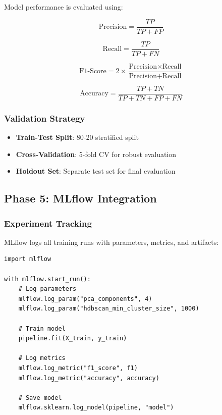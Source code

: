 Model performance is evaluated using:

\begin{equation}
    \text{Precision} = \frac{TP}{TP + FP}
\end{equation}

\begin{equation}
    \text{Recall} = \frac{TP}{TP + FN}
\end{equation}

\begin{equation}
    \text{F1-Score} = 2 \times \frac{\text{Precision} \times \text{Recall}}{\text{Precision} + \text{Recall}}
\end{equation}

\begin{equation}
    \text{Accuracy} = \frac{TP + TN}{TP + TN + FP + FN}
\end{equation}

\subsubsection{Validation Strategy}

\begin{itemize}
    \item \textbf{Train-Test Split}: 80-20 stratified split
    \item \textbf{Cross-Validation}: 5-fold CV for robust evaluation
    \item \textbf{Holdout Set}: Separate test set for final evaluation
\end{itemize}

\subsection{Phase 5: MLflow Integration}

\subsubsection{Experiment Tracking}

MLflow logs all training runs with parameters, metrics, and artifacts:

\begin{lstlisting}[style=python, caption=MLflow Tracking]
import mlflow

with mlflow.start_run():
    # Log parameters
    mlflow.log_param("pca_components", 4)
    mlflow.log_param("hdbscan_min_cluster_size", 1000)
    
    # Train model
    pipeline.fit(X_train, y_train)
    
    # Log metrics
    mlflow.log_metric("f1_score", f1)
    mlflow.log_metric("accuracy", accuracy)
    
    # Save model
    mlflow.sklearn.log_model(pipeline, "model")
\end{lstlisting}

